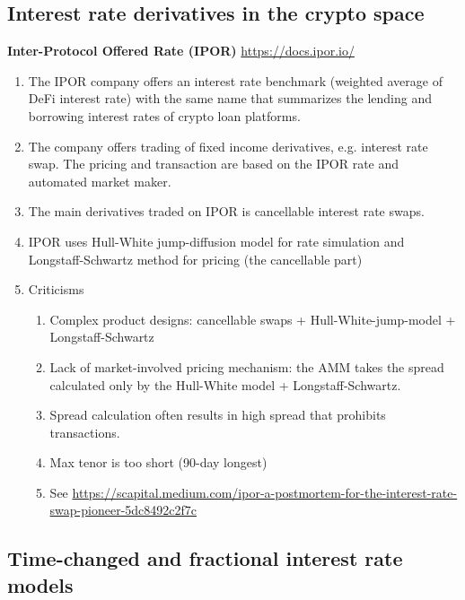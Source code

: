\documentclass[square]{article} %
\theoremstyle{plain}
\theoremstyle{definition} %
\begin{document}
\subsection{Interest rate derivatives in the crypto space}
{\bf Inter-Protocol Offered Rate (IPOR)} \url{https://docs.ipor.io/}
\begin{enumerate}
  \item The IPOR company offers an interest rate benchmark (weighted average of DeFi interest rate) with the same name that 
  summarizes the lending and borrowing interest rates of crypto loan platforms.
  \item The company offers trading of fixed income derivatives, e.g. interest rate swap. 
  The pricing and transaction are based on the IPOR rate and automated market maker. 
  \item The main derivatives traded on IPOR is cancellable interest rate swaps.
  \item IPOR uses Hull-White jump-diffusion model for rate simulation and Longstaff-Schwartz method for pricing (the cancellable part)
  \item Criticisms
  \begin{enumerate}
    \item Complex product designs: cancellable swaps + Hull-White-jump-model + Longstaff-Schwartz 
    \item Lack of market-involved pricing mechanism: the AMM takes the spread calculated only by the Hull-White model + Longstaff-Schwartz. 
    \item Spread calculation often results in high spread that prohibits transactions. 
    \item Max tenor is too short (90-day longest) 
    \item See \url{https://scapital.medium.com/ipor-a-postmortem-for-the-interest-rate-swap-pioneer-5dc8492c2f7c}
  \end{enumerate}
\end{enumerate}

\subsection{Time-changed and fractional interest rate models}
\end{document}
